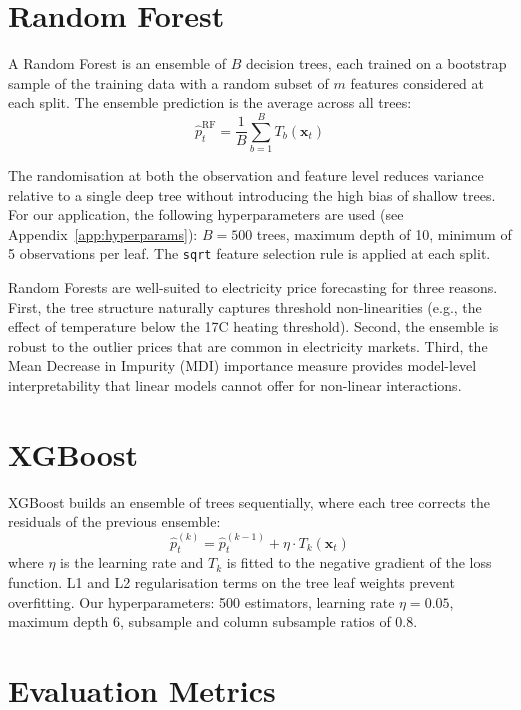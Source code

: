 \section{Random Forest}
\label{sec:rf}

A Random Forest \citep{breiman2001} is an ensemble of $B$ decision trees, each trained on a bootstrap sample of the training data with a random subset of $m$ features considered at each split. The ensemble prediction is the average across all trees:
\begin{equation}
  \hat{p}_t^{\text{RF}} = \frac{1}{B}\sum_{b=1}^{B} T_b(\mathbf{x}_t)
\end{equation}

The randomisation at both the observation and feature level reduces variance relative to a single deep tree without introducing the high bias of shallow trees. For our application, the following hyperparameters are used (see Appendix~\ref{app:hyperparams}): $B = 500$ trees, maximum depth of 10, minimum of 5 observations per leaf. The \texttt{sqrt} feature selection rule is applied at each split.

Random Forests are well-suited to electricity price forecasting for three reasons. First, the tree structure naturally captures threshold non-linearities (e.g., the effect of temperature below the 17\textdegree C heating threshold). Second, the ensemble is robust to the outlier prices that are common in electricity markets. Third, the Mean Decrease in Impurity (MDI) importance measure provides model-level interpretability that linear models cannot offer for non-linear interactions.

\section{XGBoost}
\label{sec:xgb}

XGBoost \citep{chen2016} builds an ensemble of trees sequentially, where each tree corrects the residuals of the previous ensemble:
\begin{equation}
  \hat{p}_t^{(k)} = \hat{p}_t^{(k-1)} + \eta \cdot T_k(\mathbf{x}_t)
\end{equation}
where $\eta$ is the learning rate and $T_k$ is fitted to the negative gradient of the loss function. L1 and L2 regularisation terms on the tree leaf weights prevent overfitting. Our hyperparameters: 500 estimators, learning rate $\eta = 0.05$, maximum depth 6, subsample and column subsample ratios of 0.8.

\section{Evaluation Metrics}

